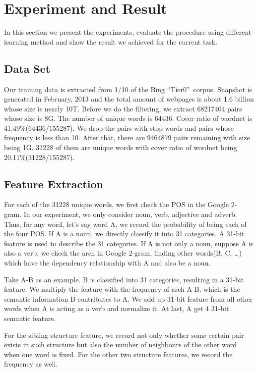 \section{Experiment and Result}
\label{sec:experiment}
In this section we present the experiments, evaluate the procedure using different learning method and show the result we achieved for the current task.
\subsection{Data Set}
Our training data is extracted from 1/10 of the Bing \textquotedblleft Tier0\textquotedblright \ corpus. Snapshot is generated in February, 2013 and the total amount of webpages is about 1.6 billion whose size is nearly 10T. 
Before we do the filtering, we extract 68217404 pairs whose size is 8G. The number of unique words is 64436. Cover ratio of wordnet is 41.49\%(64436/155287).
We drop the pairs with stop words and pairs whose frequency is less than 10. After that, there are 9464879 pairs remaining with size being 1G. 31228 of them are unique words with cover ratio of wordnet being 20.11\%(31228/155287).

\subsection{Feature Extraction}
For each of the 31228 unique words, we first check the POS in the Google 2-gram. 
In our experiment, we only consider noun, verb, adjective and adverb. 
Thus, for any word, let's say word A, we record the probability of being each of the four POS.
If A is a noun, we directly classify it into 31 categories. A 31-bit feature is used to describe the 31 categories.
If A is not only a noun, suppose A is also a verb, we check the arch in Google 2-gram, finding other words(B, C, \ldots) which have the dependency relationship with A and also be a noun.


Take A-B as an example. B is classified into 31 categories, resulting in a 31-bit feature. We multiply the feature with the frequency of arch A-B, which is the semantic information B contributes to A.
We add up 31-bit feature from all other words when A is acting as a verb and normalize it.
At last, A get 4 31-bit semantic feature.


For the sibling structure feature, we record not only whether some certain pair exists in such structure but also the number of neighbours of the other word when one word is fixed.
For the other two structure features, we record the frequency as well.


